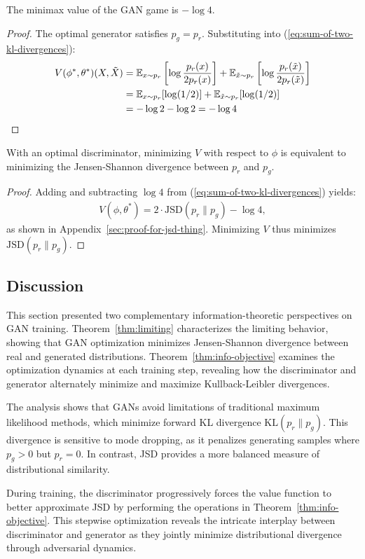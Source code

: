 \begin{lemma}
  The minimax value of the GAN game is $-\log 4$.
\end{lemma}
\begin{proof}
  The optimal generator satisfies $p_g = p_r$. Substituting into (\ref{eq:sum-of-two-kl-divergences}):
  \begin{align}
    V(\phi^*, \theta^*)(X, \tilde{X}) & = \mathbb{E}_{x \sim p_r}\left[\log{p_r(x) \over 2p_r(x)}\right] + \mathbb{E}_{\tilde{x} \sim p_r}\left[\log{p_r(\tilde{x}) \over 2p_r(\tilde{x})}\right] \\
                      & = \mathbb{E}_{x \sim p_r}[\log(1/2)] + \mathbb{E}_{\tilde{x} \sim p_r}[\log(1/2)] \\
                      & = -\log 2 - \log 2 = -\log 4
  \end{align}
\end{proof}

\begin{theorem}%
  \label{thm:limiting}
  With an optimal discriminator, minimizing $V$ with respect to $\phi$ is equivalent to minimizing the Jensen-Shannon divergence between $p_r$ and $p_g$.
\end{theorem}
\begin{proof}
  Adding and subtracting $\log 4$ from (\ref{eq:sum-of-two-kl-divergences}) yields:
  \begin{align}
    \label{eq:desired}
    V(\phi, \theta^*) = 2 \cdot \text{JSD}(p_r \| p_g) - \log 4,
  \end{align}
  as shown in Appendix~\ref{sec:proof-for-jsd-thing}. Minimizing $V$ thus minimizes $\text{JSD}(p_r \| p_g)$.
\end{proof}

\subsection{Discussion}
This section presented two complementary information-theoretic perspectives on GAN training. Theorem~\ref{thm:limiting} characterizes the limiting behavior, showing that GAN optimization minimizes Jensen-Shannon divergence between real and generated distributions. Theorem~\ref{thm:info-objective} examines the optimization dynamics at each training step, revealing how the discriminator and generator alternately minimize and maximize Kullback-Leibler divergences.

The analysis shows that GANs avoid limitations of traditional maximum likelihood methods, which minimize forward KL divergence $\text{KL}(p_r \| p_g)$. This divergence is sensitive to mode dropping, as it penalizes generating samples where $p_g > 0$ but $p_r = 0$. In contrast, JSD provides a more balanced measure of distributional similarity.

During training, the discriminator progressively forces the value function to better approximate JSD by performing the operations in Theorem~\ref{thm:info-objective}. This stepwise optimization reveals the intricate interplay between discriminator and generator as they jointly minimize distributional divergence through adversarial dynamics.


